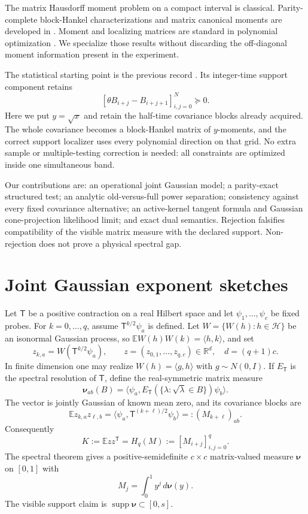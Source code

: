 \documentclass[11pt]{article}
\newcommand{\E}{\mathbb E}
\newcommand{\R}{\mathbb R}
\newcommand{\supp}{\operatorname{supp}}
\newcommand{\ip}[2]{\langle #1,#2\rangle}
\begin{document}
The matrix Hausdorff moment problem on a compact interval is classical.
Parity-complete block-Hankel characterizations and matrix canonical moments
are developed in
\cite{DetteStudden2002,ChoqueRiveroEtAl2006,ChoqueRiveroEtAl2007,FritzscheKirsteinMaedler2019}.
Moment and localizing matrices are standard in polynomial optimization
\cite{Lasserre2001,HeltonNie2012}.  We specialize those results without
discarding the off-diagonal moment information present in the experiment.

The statistical starting point is the previous record \cite{ARRPrior2026}.
Its integer-time support component retains
\[
 [\theta B_{i+j}-B_{i+j+1}]_{i,j=0}^N\succeq0.                    \tag{1.1}
\]
Here we put $y=\sqrt{x}$ and retain the half-time covariance blocks already
acquired.  The whole covariance becomes a block-Hankel matrix of $y$-moments,
and the correct support localizer uses every polynomial direction on that
grid.  No extra sample or multiple-testing correction is needed: all
constraints are optimized inside one simultaneous band.

Our contributions are: an operational joint Gaussian model; a parity-exact
structured test; an analytic old-versus-full power separation; consistency
against every fixed covariance alternative; an active-kernel tangent formula
and Gaussian cone-projection likelihood limit; and exact dual semantics.
Rejection falsifies compatibility of the visible matrix measure with the
declared support.  Non-rejection does not prove a physical spectral gap.

\section{Joint Gaussian exponent sketches}

Let $\mathsf T$ be a positive contraction on a real Hilbert space and let
$\psi_1,\ldots,\psi_c$ be fixed probes.  For $k=0,\ldots,q$, assume
$\mathsf T^{k/2}\psi_a$ is defined.  Let
$W=\{W(h):h\in\mathcal H\}$ be an isonormal Gaussian process, so
$\E W(h)W(k)=\ip{h}{k}$, and set
\[
 z_{k,a}=W(\mathsf T^{k/2}\psi_a),\qquad
 z=(z_{0,1},\ldots,z_{q,c})\in\R^d,\quad d=(q+1)c.                 \tag{2.1}
\]
In finite dimension one may realize $W(h)=\ip{g}{h}$ with
$g\sim N(0,I)$.  If $E_{\mathsf T}$ is the spectral resolution of
$\mathsf T$, define the real-symmetric matrix measure
\[
 \bm\nu_{ab}(B)=\ip{\psi_a}{E_{\mathsf T}(\{\lambda:\sqrt\lambda\in B\})\psi_b}.
\]
The vector is jointly Gaussian of known mean zero, and its covariance blocks
are
\[
 \E z_{k,a}z_{\ell,b}
 =\ip{\psi_a}{\mathsf T^{(k+\ell)/2}\psi_b}
 =:(M_{k+\ell})_{ab}.                                             \tag{2.2}
\]
Consequently
\[
 K:=\E zz^\mathsf T=H_q(M):=[M_{i+j}]_{i,j=0}^q.                  \tag{2.3}
\]
The spectral theorem gives a positive-semidefinite $c\times c$
matrix-valued measure $\bm\nu$ on $[0,1]$ with
\[
 M_j=\int_0^1 y^j\,d\bm\nu(y).                                    \tag{2.4}
\]
The visible support claim is $\supp\bm\nu\subset[0,s]$.
\end{document}
